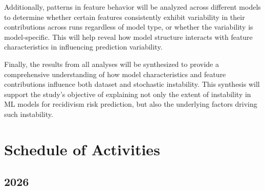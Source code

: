 \documentclass[12pt]{article}
\begin{document}
\begin{enumerate}
  Additionally, patterns in feature behavior will be analyzed across different models to determine whether certain features consistently exhibit variability in their contributions across runs regardless of model type, or whether the variability is model-specific. This will help reveal how model structure interacts with feature characteristics in influencing prediction variability.

  Finally, the results from all analyses will be synthesized to provide a comprehensive understanding of how model characteristics and feature contributions influence both dataset and stochastic instability. This synthesis will support the study's objective of explaining not only the extent of instability in ML models for recidivism risk prediction, but also the underlying factors driving such instability.
\end{enumerate}
\newpage

\section{Schedule of Activities}
\subsection{2026}
\end{document}
